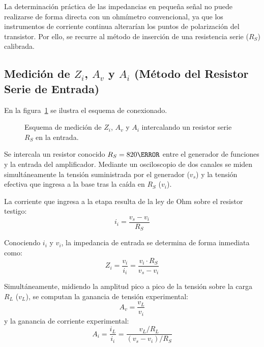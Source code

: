 La determinación práctica de las impedancias en pequeña señal no puede realizarse de forma directa con un ohmímetro
convencional, ya que los instrumentos de corriente continua alterarían los puntos de polarización del transistor. Por
ello, se recurre al método de inserción de una resistencia serie ($R_S$) calibrada.

\subsection{Medición de \texorpdfstring{$Z_i$, $A_v$ y $A_i$}{Zi, Av y Ai} (Método del Resistor Serie de Entrada)}
En la figura~\ref{crkt:medicion_zi} se ilustra el esquema de conexionado.

\begin{figure}[!ht]
  \centering
  
  \caption{Esquema de medición de $Z_i$, $A_v$ y $A_i$ intercalando un resistor serie $R_S$ en la entrada.}
  \label{crkt:medicion_zi}
\end{figure}

Se intercala un resistor conocido $R_S = 820\ohm$ entre el generador de funciones y la entrada del amplificador.
Mediante un osciloscopio de dos canales se miden simultáneamente la tensión suministrada por el generador ($v_s$) y la
tensión efectiva que ingresa a la base tras la caída en $R_S$ ($v_i$).

La corriente que ingresa a la etapa resulta de la ley de Ohm sobre el resistor testigo:
\begin{equation}
  i_i = \frac{v_s - v_i}{R_S}
  \label{eq:ii_exp}
\end{equation}

Conociendo $i_i$ y $v_i$, la impedancia de entrada se determina de forma inmediata como:
\begin{equation}
  Z_i = \frac{v_i}{i_i} = \frac{v_i \cdot R_S}{v_s - v_i}
  \label{eq:Zi_exp_formula}
\end{equation}

Simultáneamente, midiendo la amplitud pico a pico de la tensión sobre la carga $R_L$ ($v_L$), se computan la ganancia
de tensión experimental:
\begin{equation}
  A_v = \frac{v_L}{v_i}
  \label{eq:Av_exp_formula}
\end{equation}
y la ganancia de corriente experimental:
\begin{equation}
  A_i = \frac{i_L}{i_i} = \frac{v_L / R_L}{(v_s - v_i) / R_S}
  \label{eq:Ai_exp_formula}
\end{equation}

